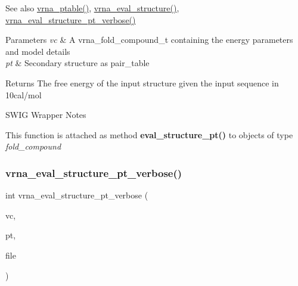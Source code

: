 \begin{DoxySeeAlso}{See also}
\hyperlink{group__struct__utils__pair__table_gae829fb8bb7f694c12a9c0bbc34c77c60}{vrna\+\_\+ptable()}, \hyperlink{group__eval_ga58f199f1438d794a265f3b27fc8ea631}{vrna\+\_\+eval\+\_\+structure()}, \hyperlink{group__eval_ga8a517cfeeae8c376ae7b1e0c401d38b4}{vrna\+\_\+eval\+\_\+structure\+\_\+pt\+\_\+verbose()}
\end{DoxySeeAlso}

\begin{DoxyParams}{Parameters}
{\em vc} & A vrna\+\_\+fold\+\_\+compound\+\_\+t containing the energy parameters and model details \\
\hline
{\em pt} & Secondary structure as pair\+\_\+table \\
\hline
\end{DoxyParams}
\begin{DoxyReturn}{Returns}
The free energy of the input structure given the input sequence in 10cal/mol
\end{DoxyReturn}
\begin{DoxyRefDesc}{S\+W\+I\+G Wrapper Notes}
\item[\hyperlink{wrappers__wrappers000032}{S\+W\+I\+G Wrapper Notes}]This function is attached as method {\bfseries eval\+\_\+structure\+\_\+pt()} to objects of type {\itshape fold\+\_\+compound} \end{DoxyRefDesc}
\mbox{\label{group__eval_ga8a517cfeeae8c376ae7b1e0c401d38b4}} 
\subsubsection{\texorpdfstring{vrna\+\_\+eval\+\_\+structure\+\_\+pt\+\_\+verbose()}{vrna\_eval\_structure\_pt\_verbose()}}
{\footnotesize\ttfamily int vrna\+\_\+eval\+\_\+structure\+\_\+pt\+\_\+verbose (\begin{DoxyParamCaption}\item[{\hyperlink{group__fold__compound_ga1b0cef17fd40466cef5968eaeeff6166}{vrna\+\_\+fold\+\_\+compound\+\_\+t} $\ast$}]{vc,  }\item[{const short $\ast$}]{pt,  }\item[{F\+I\+LE $\ast$}]{file }\end{DoxyParamCaption})}



